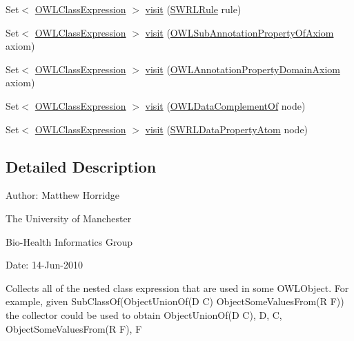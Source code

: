 \begin{DoxyCompactItemize}
\item 
Set$<$ \hyperlink{interfaceorg_1_1semanticweb_1_1owlapi_1_1model_1_1_o_w_l_class_expression}{O\-W\-L\-Class\-Expression} $>$ \hyperlink{classorg_1_1semanticweb_1_1owlapi_1_1util_1_1_o_w_l_class_expression_collector_a2c2b7b38ad9fe2b0486e11cd52b98442}{visit} (\hyperlink{interfaceorg_1_1semanticweb_1_1owlapi_1_1model_1_1_s_w_r_l_rule}{S\-W\-R\-L\-Rule} rule)
\item 
Set$<$ \hyperlink{interfaceorg_1_1semanticweb_1_1owlapi_1_1model_1_1_o_w_l_class_expression}{O\-W\-L\-Class\-Expression} $>$ \hyperlink{classorg_1_1semanticweb_1_1owlapi_1_1util_1_1_o_w_l_class_expression_collector_ab8cc1d5d41019b177ea63f15381c66b2}{visit} (\hyperlink{interfaceorg_1_1semanticweb_1_1owlapi_1_1model_1_1_o_w_l_sub_annotation_property_of_axiom}{O\-W\-L\-Sub\-Annotation\-Property\-Of\-Axiom} axiom)
\item 
Set$<$ \hyperlink{interfaceorg_1_1semanticweb_1_1owlapi_1_1model_1_1_o_w_l_class_expression}{O\-W\-L\-Class\-Expression} $>$ \hyperlink{classorg_1_1semanticweb_1_1owlapi_1_1util_1_1_o_w_l_class_expression_collector_a5e5141f1aa6a301605b92a78d8e77dee}{visit} (\hyperlink{interfaceorg_1_1semanticweb_1_1owlapi_1_1model_1_1_o_w_l_annotation_property_domain_axiom}{O\-W\-L\-Annotation\-Property\-Domain\-Axiom} axiom)
\item 
Set$<$ \hyperlink{interfaceorg_1_1semanticweb_1_1owlapi_1_1model_1_1_o_w_l_class_expression}{O\-W\-L\-Class\-Expression} $>$ \hyperlink{classorg_1_1semanticweb_1_1owlapi_1_1util_1_1_o_w_l_class_expression_collector_a40c59db758bed18545563740121f4d15}{visit} (\hyperlink{interfaceorg_1_1semanticweb_1_1owlapi_1_1model_1_1_o_w_l_data_complement_of}{O\-W\-L\-Data\-Complement\-Of} node)
\item 
Set$<$ \hyperlink{interfaceorg_1_1semanticweb_1_1owlapi_1_1model_1_1_o_w_l_class_expression}{O\-W\-L\-Class\-Expression} $>$ \hyperlink{classorg_1_1semanticweb_1_1owlapi_1_1util_1_1_o_w_l_class_expression_collector_a8a2dfa0fdcf7072018885cd34328adfc}{visit} (\hyperlink{interfaceorg_1_1semanticweb_1_1owlapi_1_1model_1_1_s_w_r_l_data_property_atom}{S\-W\-R\-L\-Data\-Property\-Atom} node)
\end{DoxyCompactItemize}


\subsection{Detailed Description}
Author\-: Matthew Horridge\par
 The University of Manchester\par
 Bio-\/\-Health Informatics Group\par
 Date\-: 14-\/\-Jun-\/2010 \par
 Collects all of the nested class expression that are used in some O\-W\-L\-Object. For example, given Sub\-Class\-Of(Object\-Union\-Of(\-D C) Object\-Some\-Values\-From(\-R F)) the collector could be used to obtain Object\-Union\-Of(\-D C), D, C, Object\-Some\-Values\-From(\-R F), F 

